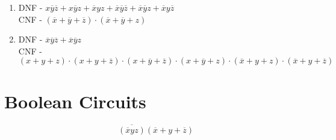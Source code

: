 \documentclass[12pt letter]{report}
\begin{document}
{{    \begin{enumerate}
      \item
            DNF - $x\overline{y}\overline{z} + x\overline{y}z + \overline{x}yz +
              \overline{x}\overline{y}\overline{z} + \overline{x}\overline{y}z + \overline{x}y\overline{z} $ \\
            CNF - $\left( \overline{x} + \overline{y} + \overline{z} \right) \cdot \left( \overline{x} +
              \overline{y} + z \right)  $
      \item
            DNF - $\overline{x}\overline{y}\overline{z} + \overline{x}\overline{y}z$ \\
            CNF - $\left( x + y + z \right) \cdot \left( x + y + \overline{z} \right) \cdot \left( x + \overline{y}
              + \overline{z}\right) \cdot \left( x + \overline{y} + z \right) \cdot \left( \overline{x} + y + z
              \right) \cdot \left( \overline{x} + y + \overline{z} \right)      $

    \end{enumerate}
  }

  \section{Boolean Circuits}

  \[
    \overline{\left( \overline{x} y z \right) } \left( \overline{x} + y + \overline{z} \right)
  \]
}
\end{document}
